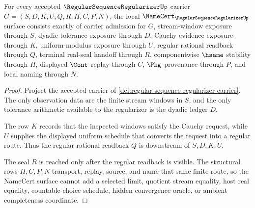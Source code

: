 \begin{theorem}
\label{thm:regular-sequence-regularizer-namecert-obligations}
For every accepted $\RegularSequenceRegularizerUp$ carrier $G=(S,D,K,U,Q,R,H,C,P,N)$, the local $\NameCert_{\RegularSequenceRegularizerUp}$ surface consists exactly of carrier admission for $G$, stream-window exposure through $S$, dyadic tolerance exposure through $D$, Cauchy evidence exposure through $K$, uniform-modulus exposure through $U$, regular rational readback through $Q$, terminal real-seal handoff through $R$, componentwise $\hsame$ stability through $H$, displayed $\Cont$ replay through $C$, $\Pkg$ provenance through $P$, and local naming through $N$.
\end{theorem}
\begin{proof}
Project the accepted carrier of \autoref{def:regular-sequence-regularizer-carrier}. The only observation data are the finite stream windows in $S$, and the only tolerance arithmetic available to the regularizer is the dyadic ledger $D$.

The row $K$ records that the inspected windows satisfy the Cauchy request, while $U$ supplies the displayed uniform schedule that converts the request into a regular route. Thus the regular rational readback $Q$ is downstream of $S,D,K,U$.

The seal $R$ is reached only after the regular readback is visible. The structural rows $H,C,P,N$ transport, replay, source, and name that same finite route, so the NameCert surface cannot add a selected limit, quotient stream equality, host real equality, countable-choice schedule, hidden convergence oracle, or ambient completeness coordinate.
\end{proof}

